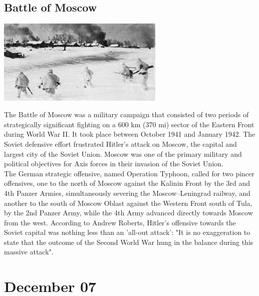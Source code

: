 \documentclass[11pt]{report}
\begin{document}
\subsection{Battle of Moscow}
\vspace{2mm}\begin{center}\includegraphics[width=8cm]{./img/battleOfMoscow.jpg}\end{center}
The Battle of Moscow was a military campaign that consisted of two periods of strategically significant fighting on a 600 km (370 mi) sector of the Eastern Front during World War II. It took place between October 1941 and January 1942. The Soviet defensive effort frustrated Hitler's attack on Moscow, the capital and largest city of the Soviet Union. Moscow was one of the primary military and political objectives for Axis forces in their invasion of the Soviet Union.\\
\indent The German strategic offensive, named Operation Typhoon, called for two pincer offensives, one to the north of Moscow against the Kalinin Front by the 3rd and 4th Panzer Armies, simultaneously severing the Moscow–Leningrad railway, and another to the south of Moscow Oblast against the Western Front south of Tula, by the 2nd Panzer Army, while the 4th Army advanced directly towards Moscow from the west. According to Andrew Roberts, Hitler's offensive towards the Soviet capital was nothing less than an 'all-out attack': "It is no exaggeration to state that the outcome of the Second World War hung in the balance during this massive attack".
\section{December 07}
\end{document}
